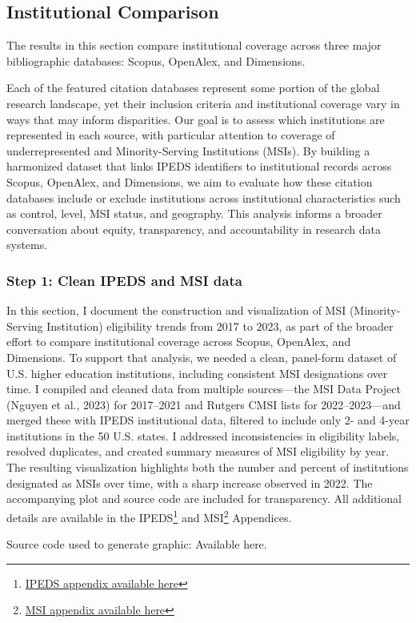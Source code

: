 \documentclass[
  letterpaper,
  DIV=11,
  numbers=noendperiod]{scrartcl}
\begin{document}
\subsection*{Institutional Comparison}\label{institutional-comparison}

The results in this section compare institutional coverage across three
major bibliographic databases: Scopus, OpenAlex, and Dimensions.

Each of the featured citation databases represent some portion of the
global research landscape, yet their inclusion criteria and
institutional coverage vary in ways that may inform disparities. Our
goal is to assess which institutions are represented in each source,
with particular attention to coverage of underrepresented and
Minority-Serving Institutions (MSIs). By building a harmonized dataset
that links IPEDS identifiers to institutional records across Scopus,
OpenAlex, and Dimensions, we aim to evaluate how these citation
databases include or exclude institutions across institutional
characteristics such as control, level, MSI status, and geography. This
analysis informs a broader conversation about equity, transparency, and
accountability in research data systems.

\subsubsection*{Step 1: Clean IPEDS and MSI
data}\label{step-1-clean-ipeds-and-msi-data}

In this section, I document the construction and visualization of MSI
(Minority-Serving Institution) eligibility trends from 2017 to 2023, as
part of the broader effort to compare institutional coverage across
Scopus, OpenAlex, and Dimensions. To support that analysis, we needed a
clean, panel-form dataset of U.S. higher education institutions,
including consistent MSI designations over time. I compiled and cleaned
data from multiple sources---the MSI Data Project (Nguyen et al., 2023)
for 2017--2021 and Rutgers CMSI lists for 2022--2023---and merged these
with IPEDS institutional data, filtered to include only 2- and 4-year
institutions in the 50 U.S. states. I addressed inconsistencies in
eligibility labels, resolved duplicates, and created summary measures of
MSI eligibility by year. The resulting visualization highlights both the
number and percent of institutions designated as MSIs over time, with a
sharp increase observed in 2022. The accompanying plot and source code
are included for transparency. All additional details are available in
the IPEDS\footnote{\href{appendices/app_ipeds.qmd}{IPEDS appendix
  available here}} and MSI\footnote{\href{appendices/app_msi.qmd}{MSI
  appendix available here}} Appendices.

Source code used to generate graphic: Available here.
\end{document}
